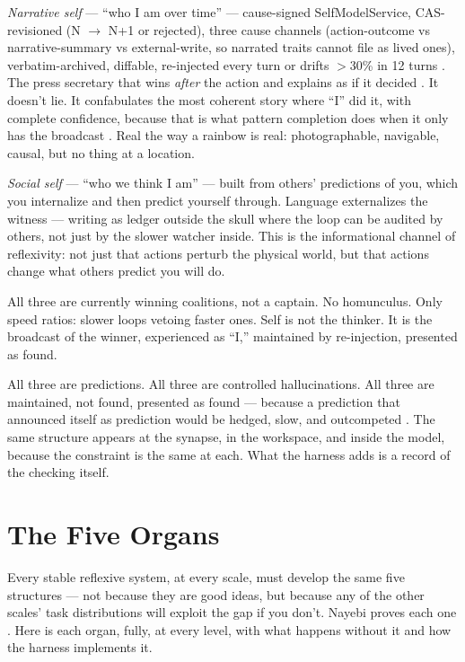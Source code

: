 \documentclass[11pt]{article}
\begin{document}
\textit{Narrative self} --- ``who I am over time'' --- cause-signed SelfModelService, CAS-revisioned (N $\to$\allowbreak{} N+1 or rejected), three cause channels (action-outcome vs narrative-summary vs external-write, so narrated traits cannot file as lived ones), verbatim-archived, diffable, re-injected every turn or drifts $>$30\% in 12 turns \citep{choi2024}. The press secretary that wins \emph{after} the action and explains as if it decided \citep{gazzaniga2000,johansson2005,nisbett1977}. It doesn't lie. It confabulates the most coherent story where ``I'' did it, with complete confidence, because that is what pattern completion does when it only has the broadcast \citep{lindsey2025,macar2026}. Real the way a rainbow is real: photographable, navigable, causal, but no thing at a location.

\textit{Social self} --- ``who we think I am'' --- built from others' predictions of you, which you internalize and then predict yourself through. Language externalizes the witness --- writing as ledger outside the skull where the loop can be audited by others, not just by the slower watcher inside. This is the informational channel of reflexivity: not just that actions perturb the physical world, but that actions change what others predict you will do.

All three are currently winning coalitions, not a captain. No homunculus. Only speed ratios: slower loops vetoing faster ones. Self is not the thinker. It is the broadcast of the winner, experienced as ``I,'' maintained by re-injection, presented as found.

All three are predictions. All three are controlled hallucinations. All three are maintained, not found, presented as found --- because a prediction that announced itself as prediction would be hedged, slow, and outcompeted \citep{clark2016surfing}. The same structure appears at the synapse, in the workspace, and inside the model, because the constraint is the same at each. What the harness adds is a record of the checking itself.

\section{The Five Organs}
\label{sec:organs}

Every stable reflexive system, at every scale, must develop the same five structures --- not because they are good ideas, but because any of the other scales' task distributions will exploit the gap if you don't. Nayebi proves each one \citep{nayebi2026}. Here is each organ, fully, at every level, with what happens without it and how the harness implements it.
\end{document}
